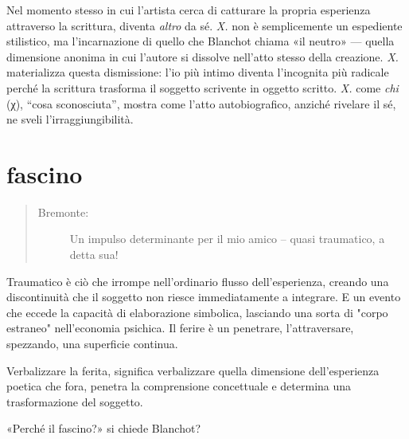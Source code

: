 Nel momento stesso in cui l'artista cerca di catturare la propria esperienza
attraverso la scrittura, diventa \emph{altro} da sé. \emph{X.} non è
semplicemente un espediente stilistico, ma l'incarnazione di quello che Blanchot \cite{fare_ref}
chiama «il neutro» — quella dimensione anonima in cui l'autore si dissolve
nell'atto stesso della creazione. \emph{X.} materializza questa dismissione:
l'io più intimo diventa l'incognita più radicale perché la scrittura trasforma
il soggetto scrivente in oggetto scritto. \emph{X.} come \emph{chi} (χ), “cosa
sconosciuta”, mostra come l'atto autobiografico, anziché rivelare il sé, ne
sveli l'irraggiungibilità. 


\section*{fascino}

\begin{quote}
  \begin{sf}
    \small
    \begin{description}
      \item[Bremonte:] %
      Un impulso determinante per il mio amico – quasi traumatico, a detta sua!
    \end{description}
  \end{sf}
\end{quote}

Traumatico è ciò che irrompe nell'ordinario flusso dell'esperienza, creando una discontinuità che il soggetto non riesce immediatamente a integrare. E un evento che eccede la capacità di elaborazione simbolica, lasciando una sorta di "corpo estraneo" nell'economia psichica. Il ferire è un penetrare, l'attraversare, spezzando, una superficie continua. 

Verbalizzare la ferita, significa verbalizzare quella dimensione dell'esperienza poetica che fora, penetra la
comprensione concettuale e determina una trasformazione del soggetto. 

«Perché il fascino?» si chiede Blanchot? \cite{blanchot82}

